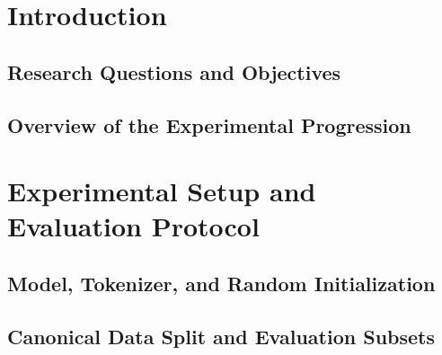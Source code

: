 %
%
%

\section{Introduction}
\label{sec:introduction}
\subsection{Research Questions and Objectives}
\subsection{Overview of the Experimental Progression}

\section{Experimental Setup and Evaluation Protocol}
\label{sec:setup}
\subsection{Model, Tokenizer, and Random Initialization}
\subsection{Canonical Data Split and Evaluation Subsets}
